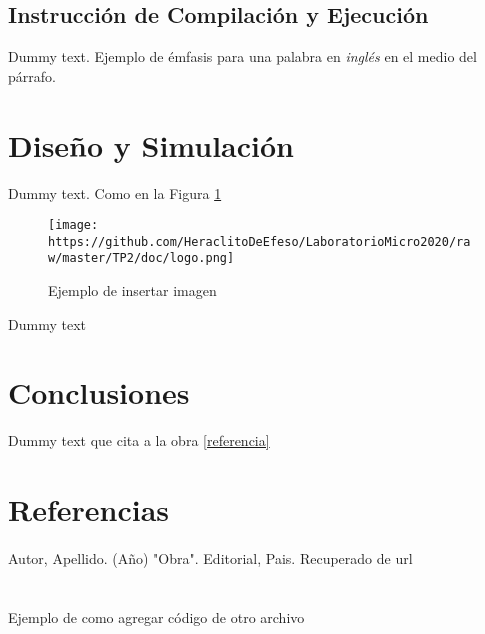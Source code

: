 \documentclass{article}
\begin{document}
\subsection{Instrucción de Compilación y Ejecución}
Dummy text. Ejemplo de émfasis para una palabra en \textit{inglés} en el medio del párrafo.

\section{Diseño y Simulación}
Dummy text. Como en la Figura \ref{ejemplo-imagen}
\begin{figure}[h]
    \centering
    \texttt{[image: https://github.com/HeraclitoDeEfeso/LaboratorioMicro2020/raw/master/TP2/doc/logo.png]}
    \caption{Ejemplo de insertar imagen}
    \label{ejemplo-imagen}
\end{figure}
\clearpage 
Dummy text

\section{Conclusiones}
Dummy text que cita a la obra \ref{referencia}

\section{Referencias}
\setcounter{secnumdepth}{4}
\renewcommand{\theparagraph}{[\arabic{paragraph}]}
\paragraph{} Autor, Apellido. (Año) "Obra". Editorial, Pais. Recuperado de url\label{referencia}

\appendix
\renewcommand\thesection{Apéndice \Alph{section}}

\section{}
Ejemplo de como agregar código de otro archivo


\section{}
\end{document}
